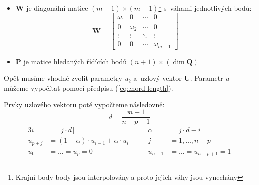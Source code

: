 \begin{itemize}
\begin{itemize}
\begin{equation}
\begin{bmatrix}
                        \end{bmatrix} \\
                    \end{equation}
                    kde
                    \begin{equation}
                        \bm{R}_k  = \bm{Q}_k - N_{0, p}(\bar{u}_k)\bm{Q}_0 - N_{n,p}(\bar{u}_k)\bm{Q}_m \quad\quad k = 1, \ldots, m -1
                    \end{equation}
              \item $\bm{W}$ je diagonální matice $(m - 1) \times (m - 1)$\footnote{Krajní body body jsou interpolovány a proto jejich váhy jsou vynechány}
                    s~váhami jednotlivých bodů:
                    \begin{equation}
                        \bm{W}  = \begin{bmatrix}
                            \omega_1 & 0        & \cdots & 0            \\
                            0        & \omega_2 & \cdots & 0            \\
                            \vdots   & \vdots   & \ddots & \vdots       \\
                            0        & 0        & \cdots & \omega_{m-1}
                        \end{bmatrix}
                    \end{equation}
              \item $\bm{P}$ je matice hledaných řídících bodů $(n + 1)\times(\dim\bm{Q})$

          \end{itemize}
\end{itemize}
Opět musíme vhodně zvolit parametry $\bar{u}_k$ a~uzlový vektor $\bm{U}$. Parametr $\bar{u}$
můžeme vypočítat pomocí předpisu (\ref{eq:chord length}).
\par Prvky uzlového vektoru poté vypočteme následovně:
\begin{equation}
    d = \frac{m + 1}{n - p + 1}
\end{equation}
\begin{alignat}{3}
    i         & = \lfloor j \cdot d \rfloor                                 & \quad\quad \alpha    & = j \cdot d - i              \\
    u_{p + j} & = (1 - \alpha)\cdot\bar{u}_{i - 1} + \alpha \cdot \bar{u}_i & \quad\quad j         & = 1, \ldots, n - p           \\
    u_0       & = \ldots = u_p = 0 \quad\quad                               & \quad\quad u_{n + 1} & = \ldots = u_{n + p + 1} = 1
\end{alignat}

